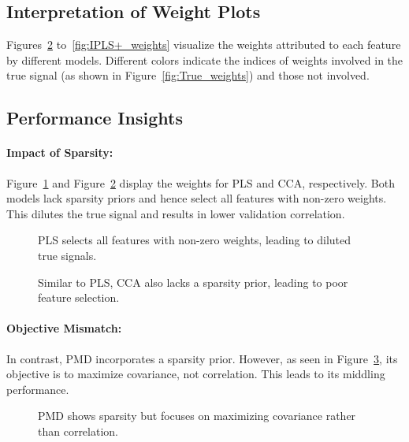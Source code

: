 \subsection{Interpretation of Weight Plots}

Figures~\ref{fig:CCA_weights} to~\ref{fig:IPLS+_weights} visualize the weights attributed to each feature by different models.
Different colors indicate the indices of weights involved in the true signal (as shown in Figure~\ref{fig:True_weights}) and those not involved.

\subsection{Performance Insights}

\paragraph{Impact of Sparsity:}
Figure~\ref{fig:PLS_weights} and Figure~\ref{fig:CCA_weights} display the weights for PLS and CCA, respectively.
Both models lack sparsity priors and hence select all features with non-zero weights.
This dilutes the true signal and results in lower validation correlation.

\begin{figure}[h]
    \centering
    
    \caption{PLS selects all features with non-zero weights, leading to diluted true signals.}
    \label{fig:PLS_weights}
\end{figure}

\begin{figure}[h]
    \centering
    
    \caption{ Similar to PLS, CCA also lacks a sparsity prior, leading to poor feature selection.}
    \label{fig:CCA_weights}
\end{figure}

\paragraph{Objective Mismatch:}
In contrast, PMD incorporates a sparsity prior. However, as seen in Figure~\ref{fig:PMD_weights}, its objective is to maximize covariance, not correlation. This leads to its middling performance.

\begin{figure}[h]
    \centering
    
    \caption{PMD shows sparsity but focuses on maximizing covariance rather than correlation.}
    \label{fig:PMD_weights}
\end{figure}

